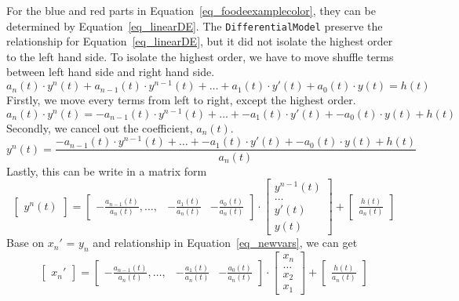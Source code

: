 For the blue and red parts in Equation~\ref{eq_foodeexamplecolor}, they can be determined by Equation~\ref{eq_linearDE}. The \verb|DifferentialModel| preserve the relationship for Equation~\ref{eq_linearDE}, but it did not isolate the highest order to the left hand side. To isolate the highest order, we have to move shuffle terms between left hand side and right hand side. 
\begin{equation}
	a_n(t) \cdot y^n(t) + a_{n-1}(t) \cdot y^{n-1}(t) + \dots + a_1(t) \cdot y'(t) + a_0(t) \cdot y(t) = h(t) \nonumber
\end{equation}
Firstly, we move every terms from left to right, except the highest order. 
\begin{equation}
	a_n(t) \cdot y^n(t)  = -a_{n-1}(t) \cdot y^{n-1}(t) + \dots + -a_1(t) \cdot y'(t) + -a_0(t) \cdot y(t) + h(t) \nonumber
\end{equation}
Secondly, we cancel out the coefficient, $a_n(t)$.
\begin{equation}
	y^n(t)  = \frac{-a_{n-1}(t) \cdot y^{n-1}(t) + \dots + -a_1(t) \cdot y'(t) + -a_0(t) \cdot y(t) + h(t)}{a_n(t)} \nonumber
\end{equation}
Lastly, this can be write in a matrix form
\begin{equation} 
  \begin{bmatrix}
		y^n(t)
	\end{bmatrix}
  = 
	\begin{bmatrix}
		-\frac{a_{n-1}(t)}{a_n(t)}, \dots, & -\frac{a_{1}(t)}{a_n(t)} & -\frac{a_{0}(t)}{a_n(t)}
	\end{bmatrix}
	\cdot
	\begin{bmatrix}
		y^{n-1}(t) \\
		\dots \\
    y'(t) \\
		y(t)  
	\end{bmatrix}
	+
	\begin{bmatrix}
		\frac{h(t)}{a_n(t)}
	\end{bmatrix}
  \nonumber
\end{equation}
Base on $x_{n}'$ = $y_{n}$ and relationship in Equation~\ref{eq_newvars}, we can get 
\begin{equation}
  \begin{bmatrix}
		x_{n}'
	\end{bmatrix}
  = 
	\begin{bmatrix}
		-\frac{a_{n-1}(t)}{a_n(t)}, \dots, & -\frac{a_{1}(t)}{a_n(t)} & -\frac{a_{0}(t)}{a_n(t)}
	\end{bmatrix}
	\cdot
	\begin{bmatrix}
		x_{n} \\
		\dots \\
    x_{2} \\
		x_{1}  
	\end{bmatrix}
	+
	\begin{bmatrix}
		\frac{h(t)}{a_n(t)}
	\end{bmatrix}
  \nonumber
\end{equation}
